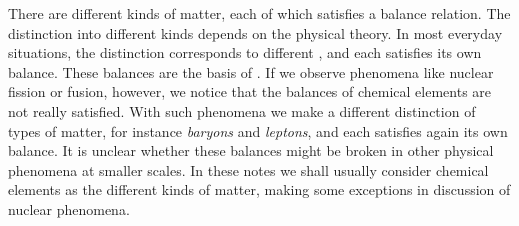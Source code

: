 There are different kinds of matter, each of which satisfies a balance relation. The distinction into different kinds depends on the physical theory. In most everyday situations, the distinction corresponds to different , and each satisfies its own balance. These balances are the basis of . If we observe phenomena like nuclear fission or fusion, however, we notice that the balances of chemical elements are not really satisfied. With such phenomena we make a different distinction of types of matter, for instance \emph{baryons} and \emph{leptons}, and each satisfies again its own balance. It is unclear whether these balances might be broken in other physical phenomena at smaller scales. In these notes we shall usually consider chemical elements as the different kinds of matter, making some exceptions in discussion of nuclear phenomena.



\label{nsec:charge_magnetic}



\label{nsec:magneticflux}

\label{nsec:energy}

\label{nsec:momentum}

\label{nsec:rotmomentum}

\label{nsec:entropy}






